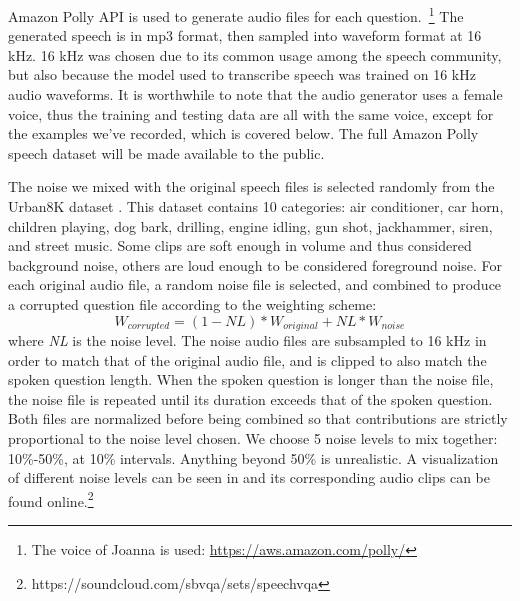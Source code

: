 \documentclass[letterpaper]{article} %
\begin{document}
Amazon Polly API is used to generate audio files for each question.~\footnote{The voice of Joanna is used: \url{https://aws.amazon.com/polly/}} The generated speech is in mp3 format, then sampled into waveform format at 16 kHz. 16 kHz was chosen due to its common usage among the speech community, but also because the model used to transcribe speech was trained on 16 kHz audio waveforms. It is worthwhile to note that the audio generator uses a female voice, thus the training and testing data are all with the same voice, except for the examples we’ve recorded, which is covered below. The full Amazon Polly speech dataset will be made available to the public.

The noise we mixed with the original speech files is selected randomly from the Urban8K dataset \cite{urban8k}. This dataset contains 10 categories: air conditioner, car horn, children playing, dog bark, drilling, engine idling, gun shot, jackhammer, siren, and street music. Some clips are soft enough in volume and thus considered background noise, others are loud enough to be considered foreground noise. For each original audio file, a random noise file is selected, and combined to produce a corrupted question file according to the weighting scheme:
\begin{displaymath}
  W_{corrupted} = (1-\mathit{NL})*W_{original}  + \mathit{NL}*W_{noise}
\end{displaymath}
where \textit{NL} is the noise level. The noise audio files are subsampled to 16 kHz in order to match that of the original audio file, and is clipped to also match the spoken question length. When the spoken question is longer than the noise file, the noise file is repeated until its duration exceeds that of the spoken question. Both files are normalized before being combined so that contributions are strictly proportional to the noise level chosen. We choose 5 noise levels to mix together: 10\%-50\%, at 10\% intervals. Anything beyond 50\% is unrealistic. A visualization of different noise levels can be seen in  and its corresponding audio clips can be found online.\footnote{https://soundcloud.com/sbvqa/sets/speechvqa}
\end{document}
